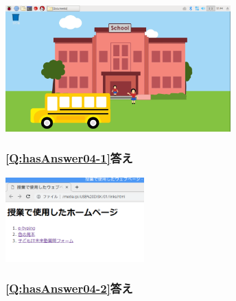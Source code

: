 \documentclass[a4paper,12pt]{jarticle}
\begin{document}
\centering
\includegraphics[width=0.65\textwidth]{textbook-img223.png}


\flushleft
\clearpage
\begin{minipage}{\textwidth}
  \subsubsection{\bfseries
  \ref*{Q:hasAnswer04-1}答え}

  \centering
  \includegraphics[width=0.4\textwidth]{textbook-img224.png}
  \flushleft

  \subsubsection{\bfseries
  \ref*{Q:hasAnswer04-2}答え}


\end{minipage}
\end{document}
